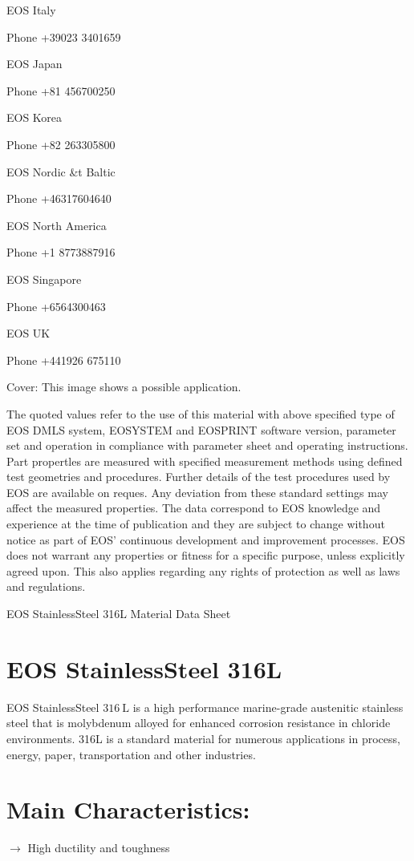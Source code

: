 \documentclass[10pt]{article}
\begin{document}
EOS Italy

Phone +39023 3401659

EOS Japan

Phone +81 456700250

EOS Korea

Phone +82 263305800

EOS Nordic \&t Baltic

Phone +46317604640

EOS North America

Phone +1 8773887916

EOS Singapore

Phone +6564300463

EOS UK

Phone +441926 675110

Cover: This image shows a possible application.

The quoted values refer to the use of this material with above specified type of EOS DMLS system, EOSYSTEM and EOSPRINT software version, parameter set and operation in compliance with parameter sheet and operating instructions. Part propertles are measured with specified measurement methods using defined test geometries and procedures. Further details of the test procedures used by EOS are available on reques. Any deviation from these standard settings may affect the measured properties. The data correspond to EOS knowledge and experience at the time of publication and they are subject to change without notice as part of EOS' continuous development and improvement processes. EOS does not warrant any properties or fitness for a specific purpose, unless explicitly agreed upon. This also applies regarding any rights of protection as well as laws and regulations.

EOS StainlessSteel 316L Material Data Sheet

\section*{EOS StainlessSteel 316L}
EOS StainlessSteel $316 \mathrm{~L}$ is a high performance marine-grade austenitic stainless steel that is molybdenum alloyed for enhanced corrosion resistance in chloride environments. 316L is a standard material for numerous applications in process, energy, paper, transportation and other industries.

\section*{Main Characteristics:}
$\longrightarrow$ High ductility and toughness
\end{document}
